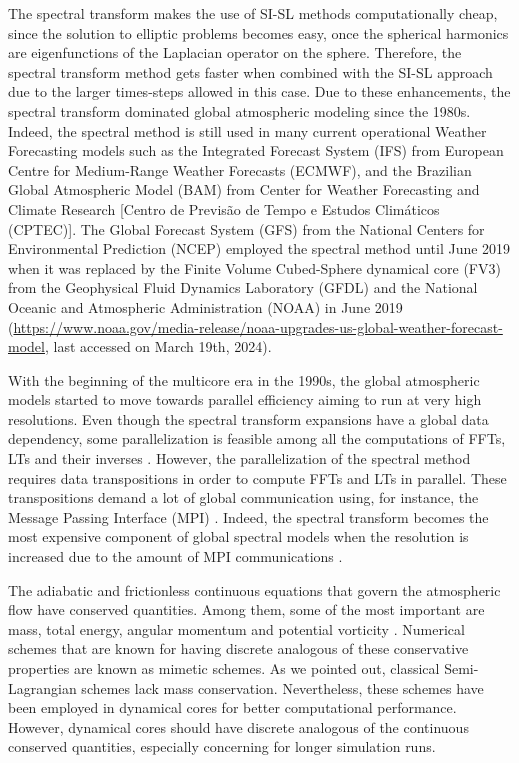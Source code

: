 The spectral transform makes the use of SI-SL methods computationally cheap, 
since the solution to elliptic problems becomes easy, once the spherical harmonics are
eigenfunctions of the Laplacian operator on the sphere.
Therefore, the spectral transform method gets faster when combined with the SI-SL approach
due to the larger times-steps allowed in this case.
Due to these enhancements, the spectral transform dominated global atmospheric modeling 
\citep{randall:2018} since the 1980s.
Indeed, the spectral method is still used in many current operational Weather Forecasting models such as
the Integrated Forecast System (IFS) from  European Centre for Medium-Range Weather Forecasts (ECMWF), and the
Brazilian Global Atmospheric Model (BAM) \citep{figueroa:2016} from  Center for Weather Forecasting 
and Climate Research [Centro de Previsão de Tempo e Estudos Climáticos (CPTEC)].
The Global Forecast System (GFS) from the National Centers for Environmental Prediction (NCEP) 
employed the spectral method until June 2019 when it was replaced by the Finite Volume Cubed-Sphere dynamical core (FV3) 
from the Geophysical Fluid Dynamics Laboratory (GFDL) and the National Oceanic and Atmospheric Administration (NOAA) in June 2019 
(\url{https://www.noaa.gov/media-release/noaa-upgrades-us-global-weather-forecast-model}, last accessed on March 19th, 2024).

With the beginning of the multicore era in the 1990s, the global atmospheric models
started to move towards parallel efficiency aiming to run at very high resolutions. 
Even though the spectral transform expansions have a global data dependency, some parallelization
is feasible among all the computations of FFTs, LTs and their inverses \citep{barros:1995}.
However, the parallelization of the spectral method requires data transpositions in order
to compute FFTs and LTs in parallel.  
These transpositions demand a lot of global communication using, for instance,
the Message Passing Interface (MPI) \citep{zheng:2018}. 
Indeed, the spectral transform becomes the most expensive component of global spectral models
when the resolution is increased due to the amount of MPI communications \citep{mueller:2019}.

The adiabatic and frictionless continuous equations that govern the atmospheric flow have 
conserved quantities. Among them, some of the most important are mass, total energy, 
angular momentum and potential vorticity \citep{thuburn:2011}.
Numerical schemes that are known for having discrete analogous of these conservative properties
are known as mimetic schemes.
As we pointed out, classical Semi-Lagrangian schemes lack mass conservation. Nevertheless, 
these schemes have been employed in dynamical cores for better computational performance.
However, dynamical cores should have discrete analogous of the 
continuous conserved quantities, especially concerning for longer simulation runs.

